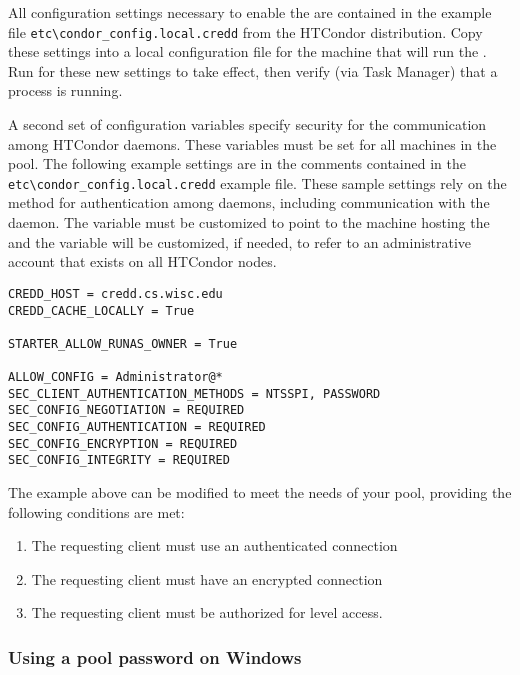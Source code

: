 All configuration settings necessary to enable the  are
contained in the example file \verb|etc\condor_config.local.credd|
from the HTCondor distribution. Copy these settings into a local
configuration file for the machine that will run the .
Run  for these new settings to take effect, then
verify (via Task Manager) that a  process is running.

A second set of configuration variables specify security for the
communication among HTCondor daemons.
These variables must be set for all machines in the pool.
The following example settings are in the comments contained in the
\verb|etc\condor_config.local.credd| example file.
These sample settings rely on the  method for
authentication among daemons, 
including communication with the  daemon.
The  variable must be customized to point to the machine
hosting the  and the  variable
will be customized, if needed, to refer to an administrative account 
that exists on all HTCondor nodes. 
\begin{verbatim}
CREDD_HOST = credd.cs.wisc.edu
CREDD_CACHE_LOCALLY = True

STARTER_ALLOW_RUNAS_OWNER = True

ALLOW_CONFIG = Administrator@*
SEC_CLIENT_AUTHENTICATION_METHODS = NTSSPI, PASSWORD
SEC_CONFIG_NEGOTIATION = REQUIRED
SEC_CONFIG_AUTHENTICATION = REQUIRED
SEC_CONFIG_ENCRYPTION = REQUIRED
SEC_CONFIG_INTEGRITY = REQUIRED
\end{verbatim}

The example above can be modified to meet the needs of your pool,
providing the following conditions are met:
\begin{enumerate}
  \item The requesting client must use an authenticated connection
  \item The requesting client must have an encrypted connection
  \item The requesting client must be authorized for  level access.
\end{enumerate}

\subsubsection{\label{sec:poolpassword-windows}Using a pool password on Windows}

